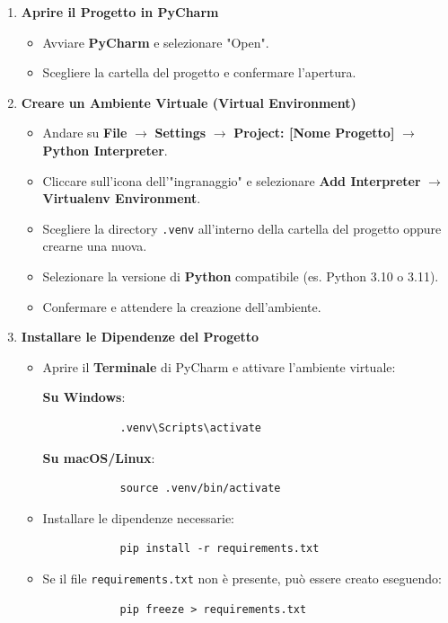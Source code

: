 \documentclass[12pt, letterpaper]{article}
\begin{document}
\begin{enumerate}
	\item \textbf{Aprire il Progetto in PyCharm}
	\begin{itemize}
		\item Avviare \textbf{PyCharm} e selezionare "Open".
		\item Scegliere la cartella del progetto e confermare l'apertura.
	\end{itemize}
	
	\item \textbf{Creare un Ambiente Virtuale (Virtual Environment)}
	\begin{itemize}
		\item Andare su \textbf{File} $\rightarrow$ \textbf{Settings} $\rightarrow$ \textbf{Project: [Nome Progetto]} $\rightarrow$ \textbf{Python Interpreter}.
		\item Cliccare sull'icona dell'"ingranaggio" e selezionare \textbf{Add Interpreter} $\rightarrow$ \textbf{Virtualenv Environment}.
		\item Scegliere la directory \texttt{.venv} all'interno della cartella del progetto oppure crearne una nuova.
		\item Selezionare la versione di \textbf{Python} compatibile (es. Python 3.10 o 3.11).
		\item Confermare e attendere la creazione dell'ambiente.
	\end{itemize}
	
	\item \textbf{Installare le Dipendenze del Progetto}
	\begin{itemize}
		\item Aprire il \textbf{Terminale} di PyCharm e attivare l'ambiente virtuale:
		
		\textbf{Su Windows}:
		\begin{lstlisting}
			.venv\Scripts\activate
		\end{lstlisting}
		
		\textbf{Su macOS/Linux}:
		\begin{lstlisting}
			source .venv/bin/activate
		\end{lstlisting}
		
		\item Installare le dipendenze necessarie:
		\begin{lstlisting}
			pip install -r requirements.txt
		\end{lstlisting}
		
		\item Se il file \texttt{requirements.txt} non è presente, può essere creato eseguendo:
		\begin{lstlisting}
			pip freeze > requirements.txt
		\end{lstlisting}
	\end{itemize}
\end{enumerate}
\end{document}
